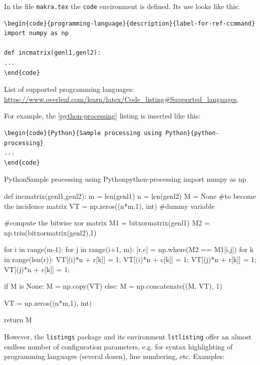 In the file \texttt{makra.tex} the \texttt{code} environment is defined. Its use looks like this:
\begin{verbatim}
\begin{code}{programming-language}{description}{label-for-ref-ccmmand}
import numpy as np
    
def incmatrix(genl1,genl2):
...
\end{code}
\end{verbatim}

List of supported programming languages: \url{https://www.overleaf.com/learn/latex/Code_listing#Supported_languages}.

For example, the \ref{python-processing} listing is inserted like this:
\begin{verbatim}
\begin{code}{Python}{Sample processing using Python}{python-processing}
...
\end{code}
\end{verbatim}

\begin{code}{Python}{Sample processing using Python}{python-processing}
import numpy as np
    
def incmatrix(genl1,genl2):
    m = len(genl1)
    n = len(genl2)
    M = None #to become the incidence matrix
    VT = np.zeros((n*m,1), int)  #dummy variable
    
    #compute the bitwise xor matrix
    M1 = bitxormatrix(genl1)
    M2 = np.triu(bitxormatrix(genl2),1) 

    for i in range(m-1):
        for j in range(i+1, m):
            [r,c] = np.where(M2 == M1[i,j])
            for k in range(len(r)):
                VT[(i)*n + r[k]] = 1;
                VT[(i)*n + c[k]] = 1;
                VT[(j)*n + r[k]] = 1;
                VT[(j)*n + c[k]] = 1;
                
                if M is None:
                    M = np.copy(VT)
                else:
                    M = np.concatenate((M, VT), 1)
                
                VT = np.zeros((n*m,1), int)
    
    return M
\end{code}

However, the \texttt{listings} package and its environment \texttt{lstlisting} 
offer an almost endless number of configuration parameters, e.g. for syntax 
highlighting of programming languages (several dozen), line numbering, etc.
Examples:


